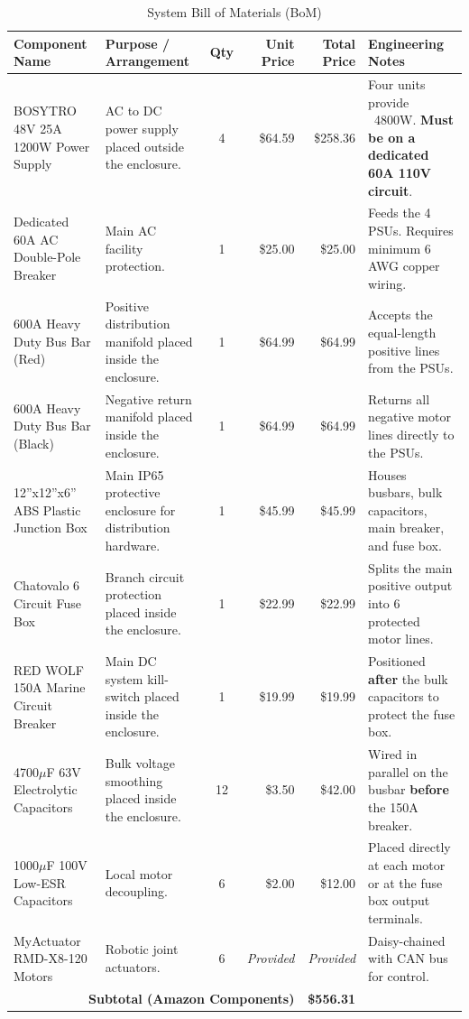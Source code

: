 \documentclass{article}
\begin{document}
\begin{table}[H]
\centering
\caption{System Bill of Materials (BoM)}
\renewcommand{\arraystretch}{1.3}
\small 
\begin{tabular}{p{3.5cm} p{4cm} c r r p{3.5cm}}
\hline
\textbf{Component Name} & \textbf{Purpose / Arrangement} & \textbf{Qty} & \textbf{Unit Price} & \textbf{Total Price} & \textbf{Engineering Notes} \\
\hline
BOSYTRO 48V 25A 1200W Power Supply & AC to DC power supply placed outside the enclosure. & 4 & \$64.59 & \$258.36 & Four units provide ~4800W. \textbf{Must be on a dedicated 60A 110V circuit}. \\
\hline
Dedicated 60A AC Double-Pole Breaker & Main AC facility protection. & 1 & \$25.00 & \$25.00 & Feeds the 4 PSUs. Requires minimum 6 AWG copper wiring. \\
\hline
600A Heavy Duty Bus Bar (Red) & Positive distribution manifold placed inside the enclosure. & 1 & \$64.99 & \$64.99 & Accepts the equal-length positive lines from the PSUs. \\
\hline
600A Heavy Duty Bus Bar (Black) & Negative return manifold placed inside the enclosure. & 1 & \$64.99 & \$64.99 & Returns all negative motor lines directly to the PSUs. \\
\hline
12''x12''x6'' ABS Plastic Junction Box & Main IP65 protective enclosure for distribution hardware. & 1 & \$45.99 & \$45.99 & Houses busbars, bulk capacitors, main breaker, and fuse box. \\
\hline
Chatovalo 6 Circuit Fuse Box & Branch circuit protection placed inside the enclosure. & 1 & \$22.99 & \$22.99 & Splits the main positive output into 6 protected motor lines. \\
\hline
RED WOLF 150A Marine Circuit Breaker & Main DC system kill-switch placed inside the enclosure. & 1 & \$19.99 & \$19.99 & Positioned \textbf{after} the bulk capacitors to protect the fuse box. \\
\hline
4700$\mu$F 63V Electrolytic Capacitors & Bulk voltage smoothing placed inside the enclosure. & 12 & \$3.50 & \$42.00 & Wired in parallel on the busbar \textbf{before} the 150A breaker. \\
\hline
1000$\mu$F 100V Low-ESR Capacitors & Local motor decoupling. & 6 & \$2.00 & \$12.00 & Placed directly at each motor or at the fuse box output terminals. \\
\hline
MyActuator RMD-X8-120 Motors & Robotic joint actuators. & 6 & \textit{Provided} & \textit{Provided} & Daisy-chained with CAN bus for control. \\
\hline
\multicolumn{4}{r}{\textbf{Subtotal (Amazon Components)}} & \textbf{\$556.31} &   \\
\hline
\end{tabular}
\end{table}
\end{document}
